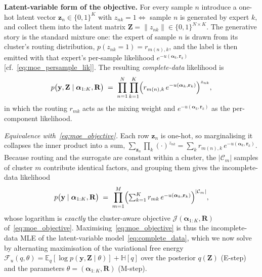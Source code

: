 \textbf{Latent-variable form of the objective.}
For every sample $n$ introduce a one-hot latent vector
$\mathbf{z}_n \in \{0, 1\}^K$ with $z_{nk} = 1 \iff$ sample $n$ is
generated by expert $k$, and collect them into the latent matrix
$\mathbf{Z} = \|z_{nk}\| \in \{0,1\}^{N \times K}$. The generative
story is the standard mixture one: the expert of sample $n$ is drawn
from its cluster's routing distribution,
$p(z_{nk} = 1) = r_{m(n), k}$, and the label is then emitted with that
expert's per-sample likelihood
$e^{-u(\boldsymbol{\alpha}_k, \mathbf{r}_k)}$
[cf.~\eqref{eq:moe_persample_lik}]. The resulting \emph{complete-data}
likelihood is
\begin{equation}
\label{eq:complete_data}
p\bigl(\mathbf{y}, \mathbf{Z} \mid \boldsymbol{\alpha}_{1:K}, \mathbf{R}\bigr)
\;=\; \prod_{n=1}^{N} \prod_{k=1}^{K}
\Bigl( r_{m(n), k}\, e^{-u(\boldsymbol{\alpha}_k, \mathbf{r}_k)} \Bigr)^{z_{nk}},
\end{equation}
in which the routing $r_{mk}$ acts as the mixing weight and
$e^{-u(\boldsymbol{\alpha}_k, \mathbf{r}_k)}$ as the per-component
likelihood.

\emph{Equivalence with~\eqref{eq:moe_objective}.} Each row
$\mathbf{z}_n$ is one-hot, so marginalising it collapses the inner
product into a sum,
$\sum_{\mathbf{z}_n} \prod_{k}(\cdot)^{z_{nk}}
= \sum_{k} r_{m(n), k}\, e^{-u(\boldsymbol{\alpha}_k, \mathbf{r}_k)}$.
Because routing and the surrogate are constant within a cluster, the
$|\mathcal{C}_m|$ samples of cluster $m$ contribute identical factors,
and grouping them gives the incomplete-data likelihood
\begin{equation}
\label{eq:incomplete_data}
p\bigl(\mathbf{y} \mid \boldsymbol{\alpha}_{1:K}, \mathbf{R}\bigr)
\;=\; \prod_{m=1}^{M}
\Bigl(\textstyle\sum_{k=1}^{K} r_{mk}\, e^{-u(\boldsymbol{\alpha}_k, \mathbf{r}_k)}\Bigr)^{|\mathcal{C}_m|},
\end{equation}
whose logarithm is \emph{exactly} the cluster-aware objective
$\mathcal{J}(\boldsymbol{\alpha}_{1:K}, \mathbf{R})$
of~\eqref{eq:moe_objective}. Maximising~\eqref{eq:moe_objective} is thus
the incomplete-data MLE of the latent-variable
model~\eqref{eq:complete_data}, which we now solve by alternating
maximisation of the variational free energy
$\mathcal{F}_u(q, \theta) = \mathbb{E}_q[\log p(\mathbf{y}, \mathbf{Z}\mid\theta)] + \mathbb{H}[q]$
over the posterior $q(\mathbf{Z})$ (E-step) and the parameters
$\theta = (\boldsymbol{\alpha}_{1:K}, \mathbf{R})$ (M-step).

